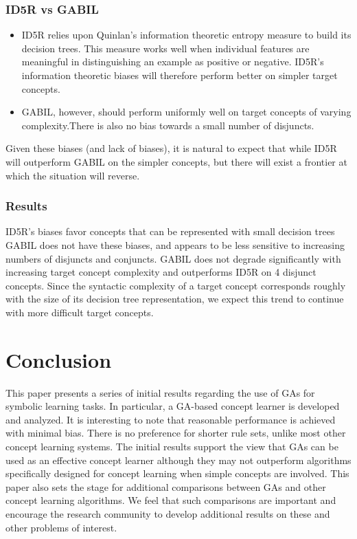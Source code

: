 \documentclass[../main.tex]{subfiles}
\begin{document}
\subsubsection{ID5R vs GABIL}

\begin{itemize}
	\item ID5R relies upon Quinlan’s information theoretic entropy measure to build its decision trees. This measure
	works well when individual features are meaningful in distinguishing an example as positive or negative.  ID5R’s
	information theoretic biases will therefore perform better on simpler target concepts.
	\item GABIL, however, should perform uniformly well on target concepts of varying complexity.There is also no bias
	towards a small number of disjuncts.
\end{itemize}

Given these biases (and lack of biases), it is natural to expect that while ID5R will outperform GABIL on the simpler
concepts, but there will exist a frontier at which the situation will reverse.

\subsubsection{Results}

ID5R’s biases favor concepts that can be represented with small decision trees GABIL does not have these biases, and
appears to be less sensitive to increasing numbers of disjuncts and conjuncts. GABIL does not degrade significantly
with increasing target concept complexity and outperforms ID5R on 4 disjunct concepts. Since the syntactic complexity
of a target concept corresponds roughly with the size of its decision tree representation, we expect this trend to
continue with more difficult target concepts.

\section{Conclusion}

This paper presents a series of initial results regarding the use of GAs for symbolic learning tasks. In particular, a
GA-based concept learner is developed and analyzed. It is interesting to note that reasonable performance is achieved
with minimal bias. There is no preference for shorter rule sets, unlike most other concept learning systems. The
initial results support the view that GAs can be used as an effective concept learner although they may not outperform
algorithms specifically designed for concept learning when simple concepts are involved. This paper also sets the stage
for additional comparisons between GAs and other concept learning algorithms. We feel that such comparisons are
important and encourage the research community to develop additional results on these and other problems of interest.
\end{document}
